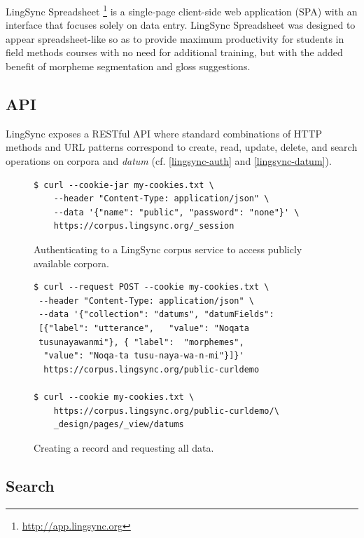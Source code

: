 \documentclass[11pt]{article}
\begin{document}
LingSync Spreadsheet%
\footnote{\url{http://app.lingsync.org}} %
is a single-page client-side web application (SPA) with an interface that
focuses solely on data entry. LingSync Spreadsheet was designed to appear
spreadsheet-like so as to provide maximum productivity for students in field
methods courses with no need for additional training, but with the added
benefit of morpheme segmentation and gloss suggestions.

\subsection{API}

LingSync exposes a RESTful API where standard combinations of HTTP methods and
URL patterns correspond to create, read, update, delete, and search operations
on corpora and \emph{datum} (cf. \autoref{lingsync-auth} and
\autoref{lingsync-datum}).


\begin{figure}[h]
\scriptsize
\begin{verbatim}
$ curl --cookie-jar my-cookies.txt \
    --header "Content-Type: application/json" \
    --data '{"name": "public", "password": "none"}' \
    https://corpus.lingsync.org/_session
\end{verbatim}
\normalsize
\caption{Authenticating to a LingSync corpus service to access publicly
available corpora.}
\label{lingsync-auth}
\end{figure}

\begin{figure}[h]
\scriptsize
\begin{verbatim}
$ curl --request POST --cookie my-cookies.txt \
 --header "Content-Type: application/json" \
 --data '{"collection": "datums", "datumFields": 
 [{"label": "utterance",   "value": "Noqata 
 tusunayawanmi"}, { "label":  "morphemes",
  "value": "Noqa-ta tusu-naya-wa-n-mi"}]}' 
  https://corpus.lingsync.org/public-curldemo 

$ curl --cookie my-cookies.txt \
	https://corpus.lingsync.org/public-curldemo/\
    _design/pages/_view/datums
\end{verbatim}
\normalsize
\caption{Creating a record and requesting all data.}
\label{lingsync-datum}
\end{figure}


\subsection{Search}
\end{document}
